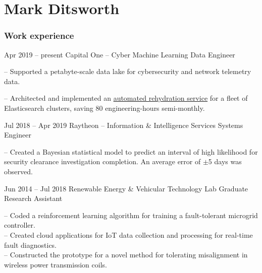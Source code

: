 \documentclass{tccv}
\begin{document}
\part{Mark Ditsworth}

\section{Work experience}

\begin{eventlist}
\item{Apr 2019 -- present}
    {Capital One -- Cyber Machine Learning}
    {Data Engineer}
    
-- Supported a petabyte-scale data lake for cybersecurity and network telemetry data.

-- Architected and implemented an \href{https://www.youtube.com/watch?v=-hUjtAmHwyk}{automated rehydration service} for a fleet of Elasticsearch clusters, saving 80 engineering-hours semi-monthly.

\item{Jul 2018 -- Apr 2019}
    {Raytheon -- Information \& Intelligence Services}
    {Systems Engineer}
    
-- Created a Bayesian statistical model to predict an interval of high
likelihood for security clearance investigation completion. An average
error of $\pm$5 days was observed.

\item{Jun 2014 -- Jul 2018}
     {Renewable Energy \& Vehicular Technology Lab}
     {Graduate Research Assistant}

-- Coded a reinforcement learning algorithm for training a fault-tolerant
microgrid controller.\\
-- Created cloud applications for IoT data collection
and processing for real-time fault diagnostics.\\
-- Constructed the prototype for a novel method for tolerating misalignment in wireless power transmission coils.

%

\end{eventlist}
\vspace{-12pt}
\end{document}
